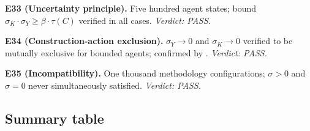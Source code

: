 \documentclass[twocolumn,11pt,a4paper]{article}
\begin{document}
\textbf{E33 (Uncertainty principle).}  Five hundred agent states; bound
$\sigma_K\cdot\sigma_Y\geq\beta\cdot\tau(C)$ verified in all cases.
\textit{Verdict: PASS.}

\textbf{E34 (Construction-action exclusion).}  $\sigma_Y\to 0$ and
$\sigma_K\to 0$ verified to be mutually exclusive for bounded agents;
confirmed by .  \textit{Verdict: PASS.}

\textbf{E35 (Incompatibility).}  One thousand methodology configurations;
$\sigma>0$ and $\sigma=0$ never simultaneously satisfied.
\textit{Verdict: PASS.}

\subsection{Summary table}
\label{sec:numerical:summary}
\end{document}
